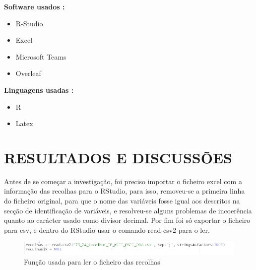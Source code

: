 \documentclass[%
 aip,
cp,  %
 amsmath,amssymb,%
 reprint,%
]{revtex4-2}
\begin{document}
\vspace{2cm}

\textbf{Software usados : }
\begin{itemize}
    \item R-Studio
    \item Excel
    \item Microsoft Teams
    \item Overleaf
\end{itemize}

\vspace{10pt}

\textbf{Linguagens usadas : }
\begin{itemize}
    \item R
    \item Latex
\end{itemize}

\newpage
   


\section{RESULTADOS E DISCUSSÕES \label{sec:Res}} 

Antes de se começar a investigação, foi preciso importar o ficheiro excel com a informação das recolhas para o RStudio, para isso, removeu-se a primeira linha do ficheiro original, para que o nome das variáveis fosse igual aos descritos na secção de identificação de variáveis, e resolveu-se alguns problemas de incoerência quanto ao carácter usado como divisor decimal. Por fim foi só exportar o ficheiro para csv, e dentro do RStudio usar o comando read-csv2 para o ler.

\vspace{10pt}

\begin{figure}[h]
    \centering
    \includegraphics[width=1\linewidth]{imagens/LeituraExcel.png}
    \caption{Função usada para ler o ficheiro das recolhas}
    \label{fig:enter-label}
\end{figure}

\vspace{10pt}
\end{document}
